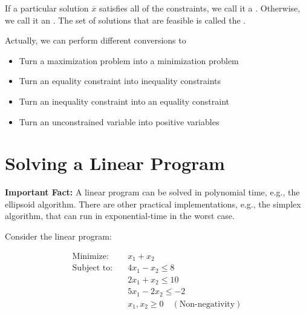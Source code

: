 \documentclass[11  pt]{article}
\begin{document}
If a particular solution $\overline{x}$ satisfies all of the constraints, we call it a . 
Otherwise, we call it an .
The set of solutions that are feasible is called the .

Actually, we can perform different conversions to

\begin{itemize}
	\item Turn a maximization problem into a minimization problem \\
	
	\vs{2cm}
	
	\item Turn an equality constraint into inequality constraints \\
	
		\vs{2cm}
	
	
	\item Turn an inequality constraint into an equality constraint \\
	
		\vs{2cm}
	
	\item Turn an unconstrained variable into positive variables \\
\end{itemize}


\vfill



\newpage
\section{Solving a Linear Program}
\textbf{Important Fact:} A linear program can be solved in polynomial time, e.g., the ellipsoid algorithm. 
There are other practical implementations, e.g., the simplex algorithm, that can run in exponential-time in the worst case. 

\vs{1cm}
Consider the linear program:

\[
\begin{aligned}
\text{Minimize:} \quad & x_1 + x_2 \\
\text{Subject to:} \quad & 4x_1 - x_2 \leq 8 \\
& 2x_1 + x_2 \leq 10 \\
& 5x_1 - 2x_2 \leq -2 \\
& x_1, x_2 \geq 0 \quad (\text{Non-negativity})
\end{aligned}
\]
\end{document}
